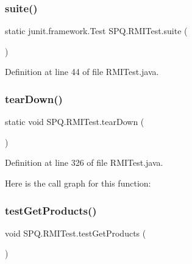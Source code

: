 \mbox{\label{class_s_p_q_1_1_r_m_i_test_a7cc9358271c503f37c8092d93a6ce95c}} 
\subsubsection{\texorpdfstring{suite()}{suite()}}
{\footnotesize\ttfamily static junit.\+framework.\+Test S\+P\+Q.\+R\+M\+I\+Test.\+suite (\begin{DoxyParamCaption}{ }\end{DoxyParamCaption})\hspace{0.3cm}{\ttfamily [static]}}



Definition at line 44 of file R\+M\+I\+Test.\+java.

\mbox{\label{class_s_p_q_1_1_r_m_i_test_a76a8f88205d4a70c8ed81ee03ab7fa45}} 
\subsubsection{\texorpdfstring{tear\+Down()}{tearDown()}}
{\footnotesize\ttfamily static void S\+P\+Q.\+R\+M\+I\+Test.\+tear\+Down (\begin{DoxyParamCaption}{ }\end{DoxyParamCaption})\hspace{0.3cm}{\ttfamily [static]}}



Definition at line 326 of file R\+M\+I\+Test.\+java.

Here is the call graph for this function\+:
\mbox{\label{class_s_p_q_1_1_r_m_i_test_afd1616ccf97ef054e05f3ca90d22753e}} 
\subsubsection{\texorpdfstring{test\+Get\+Products()}{testGetProducts()}}
{\footnotesize\ttfamily void S\+P\+Q.\+R\+M\+I\+Test.\+test\+Get\+Products (\begin{DoxyParamCaption}{ }\end{DoxyParamCaption})}



